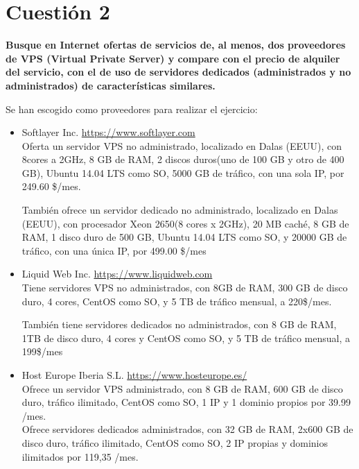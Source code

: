 \documentclass[a4paper,11pt]{article}
\newenvironment{answer}{%
\begin{list}{}{%
\addtolength{\hoffset}{0cm}
}%
\item[]}{\end{list}}
\begin{document}
\section{Cuestión 2}
\textbf{Busque en Internet ofertas de servicios de, al menos, dos proveedores de
VPS (Virtual Private Server) y compare con el precio de alquiler del servicio, con el de
uso de servidores dedicados (administrados y no administrados) de características
similares.}
\begin{answer}
 Se han escogido como proveedores para realizar el ejercicio:
 \begin{itemize}
  \item Softlayer Inc.  \url{https://www.softlayer.com}\\
   Oferta un servidor VPS no administrado, localizado en Dalas (EEUU), con 8cores a 2GHz, 8 GB de RAM, 2 discos duros(uno de 
   100 GB y otro de 400 GB), Ubuntu 14.04 LTS como SO, 5000 GB de tráfico, con una sola IP, por 249.60 \$/mes.
  
   También ofrece un servidor dedicado no administrado, localizado en Dalas (EEUU), con procesador Xeon 2650(8 cores x 2GHz), 20 MB caché,
   8 GB de RAM, 1 disco duro de 500 GB, Ubuntu 14.04 LTS como SO, y 20000 GB de tráfico, con una única IP, por 499.00 \$/mes
  \item Liquid Web Inc. \url{https://www.liquidweb.com}\\
   Tiene servidores VPS no administrados, con 8GB de RAM, 300 GB de disco duro, 4 cores, CentOS como SO, y 5 TB de tráfico mensual, a 220\$/mes.
   
   También tiene servidores dedicados no administrados, con 8 GB de RAM, 1TB de disco duro, 4 cores y CentOS como SO, y 5 TB de tráfico mensual, a 199\$/mes
  \item Host Europe Iberia S.L. \url{https://www.hosteurope.es/}\\
   Ofrece un servidor VPS administrado, con 8 GB de RAM, 600 GB de disco duro, tráfico ilimitado, CentOS como SO,
   1 IP y 1 dominio propios por 39.99 /mes.\\
   Ofrece servidores dedicados administrados, con 32 GB de RAM, 2x600 GB de disco duro, tráfico ilimitado, CentOS como
   SO, 2 IP propias y dominios ilimitados por 119,35 /mes.
 \end{itemize}
\end{answer}
\end{document}
